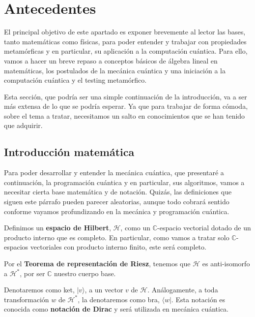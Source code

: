 \cleardoublepage

\chapter{Antecedentes}
\label{Cap2:Antecedentes}

El principal objetivo de este apartado es exponer brevemente al lector las bases, tanto matemáticas como físicas, para poder entender y trabajar con propiedades metamórficas y en particular, su aplicación a la computación cuántica. Para ello, vamos a hacer un breve repaso a conceptos básicos de álgebra lineal en matemáticas, los postulados de la mecánica cuántica y una iniciación a la computación cuántica y el testing metamórfico. 

\vspace{5pt}
Esta sección, que podría ser una simple continuación de la introducción, va a ser más extensa de lo que se podría esperar. Ya que para trabajar de forma cómoda, sobre el tema a tratar, necesitamos un salto en conocimientos que se han tenido que adquirir.

\section{Introducción matemática}
\label{Sec2.1:Matematicas}
Para poder desarrollar y entender la mecánica cuántica, que presentaré a continuación, la programación cuántica y en particular, sus algoritmos, vamos a necesitar cierta base matemática y de notación. Quizás, las definiciones que siguen este párrafo pueden parecer aleatorias, aunque todo cobrará sentido conforme vayamos profundizando en la mecánica y programación cuántica.

\vspace{5pt}

Definimos un \textbf{espacio de Hilbert}, $\mathscr{H}$, como un $\mathbb{C}$-espacio vectorial dotado de un producto interno que es completo. En particular, como vamos a tratar solo $\mathbb{C}$-espacios vectoriales con producto interno finito, este será completo.

\vspace{5pt}

Por el \textbf{Teorema de representación de Riesz}, tenemos que $\mathscr{H}$ es anti-isomorfo a $\mathscr{H}^{*}$, por ser $\mathbb{C}$ nuestro cuerpo base.

\vspace{5pt}

Denotaremos como ket, $|v\rangle$, a un vector $v$ de $\mathscr{H}$. Análogamente, a toda transformación $w$ de $\mathscr{H}^{*}$, la denotaremos como bra, $\langle w|$. Esta notación es conocida como \textbf{notación de Dirac} y será utilizada en mecánica cuántica.

